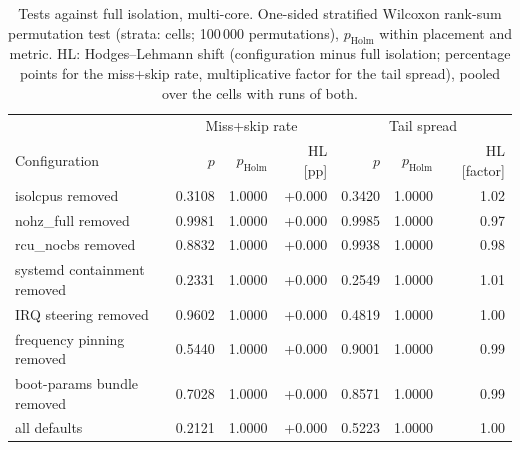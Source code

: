 \begin{table}[ht]
\centering
\small
\begin{tabular}{l|rrr|rrr}
\toprule
 & \multicolumn{3}{c|}{Miss+skip rate} & \multicolumn{3}{c}{Tail spread} \\
Configuration & $p$ & $p_{\mathrm{Holm}}$ & HL [pp] & $p$ & $p_{\mathrm{Holm}}$ & HL [factor] \\
\midrule
isolcpus removed & 0.3108 & 1.0000 & +0.000 & 0.3420 & 1.0000 & 1.02 \\
nohz\_full removed & 0.9981 & 1.0000 & +0.000 & 0.9985 & 1.0000 & 0.97 \\
rcu\_nocbs removed & 0.8832 & 1.0000 & +0.000 & 0.9938 & 1.0000 & 0.98 \\
systemd containment removed & 0.2331 & 1.0000 & +0.000 & 0.2549 & 1.0000 & 1.01 \\
IRQ steering removed & 0.9602 & 1.0000 & +0.000 & 0.4819 & 1.0000 & 1.00 \\
frequency pinning removed & 0.5440 & 1.0000 & +0.000 & 0.9001 & 1.0000 & 0.99 \\
boot-params bundle removed & 0.7028 & 1.0000 & +0.000 & 0.8571 & 1.0000 & 0.99 \\
all defaults & 0.2121 & 1.0000 & +0.000 & 0.5223 & 1.0000 & 1.00 \\
\bottomrule
\end{tabular}
\caption{Tests against full isolation, multi-core. One-sided stratified Wilcoxon rank-sum permutation test (strata: cells; 100\,000 permutations), $p_{\mathrm{Holm}}$ within placement and metric. HL: Hodges--Lehmann shift (configuration minus full isolation; percentage points for the miss+skip rate, multiplicative factor for the tail spread), pooled over the cells with runs of both.}
\label{tab:rq1-rerun-tests-multi-core}
\end{table}
